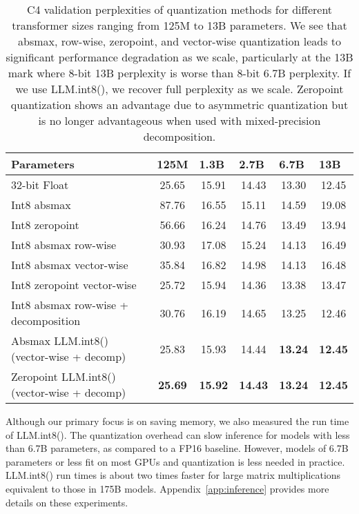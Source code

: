 \documentclass{article}
\begin{document}
\begin{table}[]
\centering
\caption{C4 validation perplexities of quantization methods for different transformer sizes ranging from 125M to 13B parameters. We see that absmax, row-wise, zeropoint, and vector-wise quantization leads to significant performance degradation as we scale, particularly at the 13B mark where 8-bit 13B perplexity is worse than 8-bit 6.7B perplexity. If we use LLM.int8(), we recover full perplexity as we scale. Zeropoint quantization shows an advantage due to asymmetric quantization but is no longer advantageous when used with mixed-precision decomposition.}
\label{tbl:inference}
\begin{tabular}{lccccc}\toprule
Parameters &
  \multicolumn{1}{l}{125M} &
  \multicolumn{1}{l}{1.3B} &
  \multicolumn{1}{l}{2.7B} &
  \multicolumn{1}{l}{6.7B} &
  \multicolumn{1}{l}{13B} \\
\toprule
32-bit Float                 & 25.65 & 15.91 & 14.43 & 13.30  & 12.45 \\\midrule
Int8 absmax                   & 87.76 & 16.55 & 15.11 & 14.59 & 19.08 \\
Int8 zeropoint                & 56.66 & 16.24 & 14.76 & 13.49 & 13.94 \\\midrule
Int8 absmax row-wise                   & 30.93 & 17.08 & 15.24 & 14.13 & 16.49 \\
Int8 absmax vector-wise                   & 35.84 & 16.82 & 14.98 & 14.13 & 16.48 \\
Int8 zeropoint vector-wise         & 25.72 & 15.94 & 14.36 & 13.38 & 13.47 \\\midrule
Int8 absmax row-wise + decomposition                     & 30.76 & 16.19 & 14.65 & 13.25 & 12.46 \\
Absmax LLM.int8() (vector-wise + decomp)          & 25.83 & 15.93 & 14.44 & \bf 13.24 & \bf 12.45 \\
Zeropoint LLM.int8() (vector-wise + decomp)          & \bf 25.69 & \bf 15.92 & \bf 14.43 & \bf 13.24 & \bf 12.45\\\bottomrule
\end{tabular}
\end{table}


Although our primary focus is on saving memory, we also measured the run time of LLM.int8(). The quantization overhead can slow inference for models with less than 6.7B parameters, as compared to a FP16 baseline. However, models of 6.7B parameters or less fit on most GPUs and quantization is less needed in practice. LLM.int8() run times is about two times faster for large matrix multiplications equivalent to those in 175B models. Appendix~\ref{app:inference} provides more details on these experiments. 
\end{document}

